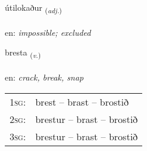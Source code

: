 \documentclass[frontgrid, backgrid]{flacards}\usepackage[]{graphicx}\usepackage[]{xcolor}
\begin{document}
\renewcommand{\flhead}{\vskip5pt \fboxsep=0pt {\small\bfseries\footnotesize Lýsingarorð | Adjective}}
\renewcommand{\fcfoot}{\vskip5pt \fboxsep=0pt \hspace{2pt}{\small\bfseries\footnotesize 3K}}

\renewcommand{\blhead}{\vskip5pt {\small\bfseries\footnotesize Lýsingarorð | Adjective }}
\renewcommand{\bcfoot}{\vskip5pt \hspace{2pt}{\small\bfseries\footnotesize 3K}}


{útilokaður \small{\textsubscript{(\textit{adj.})}} \\[1ex] %
\textphonetic{[uːtɪlɔkaðʏr]} \\
en: \emph{impossible; excluded} \\  [2ex]
\renewcommand*{\arraystretch}{0.8}
}

\renewcommand{\flhead}{\vskip5pt \fboxsep=0pt {\small\bfseries\footnotesize Sagnorð | Verb}}
\renewcommand{\fcfoot}{\vskip5pt \fboxsep=0pt \hspace{2pt}{\small\bfseries\footnotesize 3K}}

\renewcommand{\blhead}{\vskip5pt {\small\bfseries\footnotesize Sagnorð | Verb }}
\renewcommand{\bcfoot}{\vskip5pt \hspace{2pt}{\small\bfseries\footnotesize 3K}}


{bresta \small{\textsubscript{(\textit{v.})}} \\[1ex] %
\textphonetic{[prɛsta]} \\
en: \emph{crack, break, snap} \\  [2ex]
\renewcommand*{\arraystretch}{0.8}
\begin{tabular}{p{1cm}l}
\textsc{1sg}: & brest -- brast -- brostið \\ 
\textsc{2sg}: & brestur -- brast -- brostið \\ 
\textsc{3sg}: & brestur -- brast -- brostið \\ 
\end{tabular}
}
\end{document}
